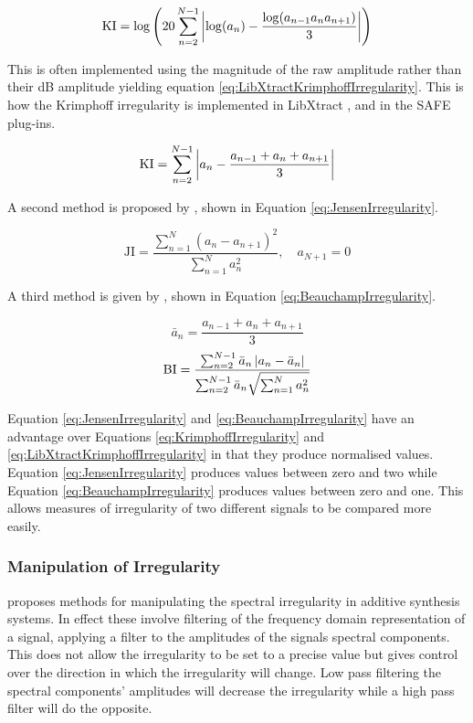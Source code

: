 		\begin{equation}
			\textrm{KI} = \log \left( 20 \sum_{n = 2}^{N - 1}
				                  \left|\log(a_{n}) - \frac{\log(a_{n-1}a_{n}a_{n+1})}{3}\right|
					   \right)
			\label{eq:KrimphoffIrregularity}
		\end{equation}

		This is often implemented using the magnitude of the raw amplitude rather than their dB amplitude yielding
		equation \ref{eq:LibXtractKrimphoffIrregularity}. This is how the Krimphoff irregularity is implemented
		in LibXtract \citep{bullock2007libxtract}, and in the SAFE plug-ins.

		\begin{equation}
			\textrm{KI} = \sum_{n = 2}^{N - 1}
					  \left|a_{n} - \frac{a_{n-1} + a_{n} + a_{n+1}}{3}\right|
			\label{eq:LibXtractKrimphoffIrregularity}
		\end{equation}
		

		A second method is proposed by \citet{jensen1999timbre}, shown in Equation \ref{eq:JensenIrregularity}.

		\begin{equation}
			\textrm{JI} = \frac{\sum_{n = 1}^{N} (a_{n} - a_{n+1})^{2}}
			                   {\sum_{n = 1}^{N} a_{n}^{2}},
			              \quad a_{N+1} = 0
			\label{eq:JensenIrregularity}
		\end{equation}

		A third method is given by \citet{beauchamp2007analysis}, shown in Equation \ref{eq:BeauchampIrregularity}.

		\[ \bar{a}_{n} = \frac{a_{n-1} + a_{n} + a_{n+1}}{3} \]
		\begin{equation}
			\textrm{BI} = \frac{\sum_{n = 2}^{N - 1} \bar{a}_{n} \left|a_{n} - \bar{a}_{n}\right|}
					   {\sum_{n = 2}^{N - 1} \bar{a}_{n} \sqrt{\sum_{n = 1}^{N} a_{n}^{2}}}
			\label{eq:BeauchampIrregularity}
		\end{equation}

		Equation \ref{eq:JensenIrregularity} and \ref{eq:BeauchampIrregularity} have an advantage over Equations
		\ref{eq:KrimphoffIrregularity} and \ref{eq:LibXtractKrimphoffIrregularity} in that they produce normalised
		values. Equation \ref{eq:JensenIrregularity} produces values between zero and two while Equation
		\ref{eq:BeauchampIrregularity} produces values between zero and one. This allows measures of irregularity
		of two different signals to be compared more easily.

		\subsubsection*{Manipulation of Irregularity}
			\citet{beauchamp2007analysis} proposes methods for manipulating the spectral irregularity in
			additive synthesis systems. In effect these involve filtering of the frequency domain
			representation of a signal, applying a filter to the amplitudes of the signals spectral components.
			This does not allow the irregularity to be set to a precise value but gives control over the
			direction in which the irregularity will change. Low pass filtering the spectral components'
			amplitudes will decrease the irregularity while a high pass filter will do the opposite.
			
